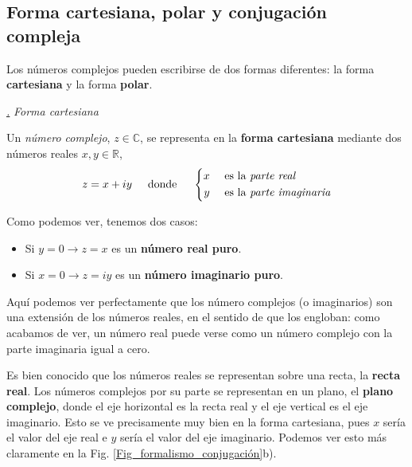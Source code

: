 \documentclass[a4paper,11pt]{book} %
\numberwithin{equation}{chapter}
\def\lch{\left\{}
\def\subsubiContadorIt{\par\addtocounter{subsubsection}{1}\underline{\it\thesubsubsection.}\hskip0.5cm \setcounter{subsubsubsectionIt}{0}}
\newcommand{\SubsubiIt}[1]{
		\subsubiContadorIt \textit{#1}
	}
\newcounter{subsubsubsectionIt}[subsubsection]
\begin{document}
		\subsection{Forma cartesiana, polar y conjugación compleja}

Los números complejos pueden escribirse de dos formas diferentes: la forma \textbf{cartesiana} y la forma \textbf{polar}.

	
			\SubsubiIt{Forma cartesiana}

\begin{mybox_gray2}{}
Un \textit{número complejo}, $z \in \mathbb{C}$, se representa en la \textbf{forma cartesiana} mediante dos números reales $x,y \in \mathbb{R}$,
	\begin{equation}
	z = x + iy \hspace{0.5cm} \text{donde} \hspace{0.5cm} 
	\lch 
	\begin{split}
	x & \quad \text{ es la \textit{parte real}} \\
	y & \quad \text{ es la \textit{parte imaginaria}} \\
	\end{split}
	\right.
	\end{equation}
\end{mybox_gray2}



Como podemos ver, tenemos dos casos:
\begin{itemize}
	\item Si $y=0 \rightarrow z = x$ es un \textbf{número real puro}. 
	\item Si $x = 0 \rightarrow z = iy$ es un \textbf{número imaginario puro}.
\end{itemize}
Aquí podemos ver perfectamente que los número complejos (o imaginarios) son una extensión de los números reales, en el sentido de que los engloban: como acabamos de ver, un número real puede verse como un número complejo con la parte imaginaria igual a cero.


Es bien conocido que los números reales se representan sobre una recta, la \textbf{recta real}. Los números complejos por su parte se representan en un plano, el \textbf{plano complejo}, donde el eje horizontal es la recta real y el eje vertical es el eje imaginario. Esto se ve precisamente muy bien en la forma cartesiana, pues $x$ sería el valor del eje real e $y$ sería el valor del eje imaginario. Podemos ver esto más claramente en la Fig. \ref{Fig_formalismo_conjugación}b). 
\end{document}
